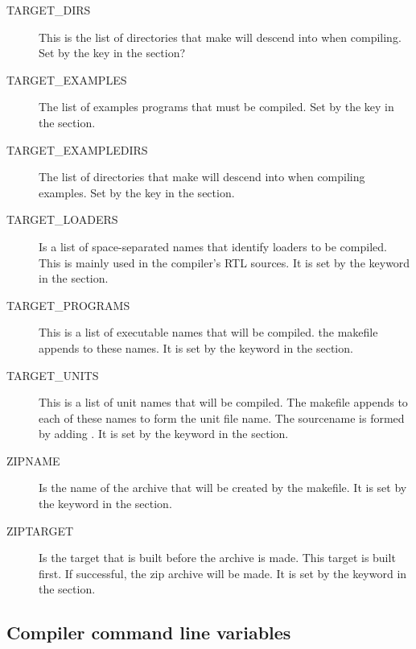 \begin{description}
\item[TARGET\_DIRS] This is the list of directories that make will descend
into when compiling. Set by the  key in the  section?

\item[TARGET\_EXAMPLES] The list of examples programs that must be compiled.
Set by the  key in the  section.

\item[TARGET\_EXAMPLEDIRS] The list of directories that make will descend
into when compiling examples. Set by the  key in the 
 section.

\item[TARGET\_LOADERS] Is a list of space-separated names that identify
loaders to be compiled. This is mainly used in the compiler's RTL sources.
It is set by the  keyword in the  section.

\item[TARGET\_PROGRAMS] This is a list of executable names that will be compiled.
the makefile appends  to these names. It is set by the
 keyword in the  section.

\item[TARGET\_UNITS] This is a list of unit names that will be compiled. The
makefile appends  to each of these names to form the unit file
name. The sourcename is formed by adding .
It is set by the  keyword in the  section.

\item[ZIPNAME] Is the name of the archive that will be created by the
makefile.
It is set by the  keyword in the  section.

\item[ZIPTARGET] Is the target that is built before the archive is made.
This target is built first. If successful, the zip archive will be made.
It is set by the  keyword in the  section.

\end{description}

\subsection{Compiler command line variables}

